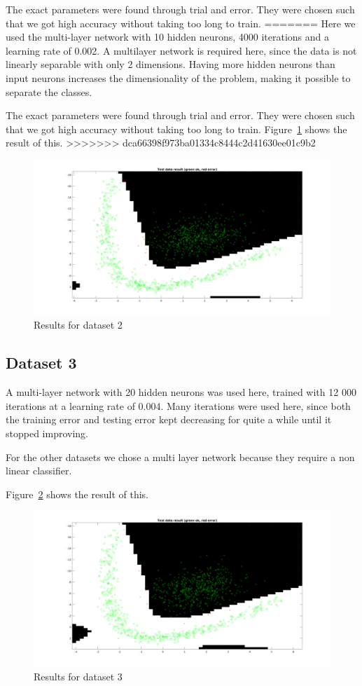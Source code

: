 \documentclass{article}
\begin{document}
The exact parameters were found through trial and error. They were
chosen such that we got high accuracy without taking too long to
train.
=======
Here we used the multi-layer network with 10 hidden neurons, 4000 iterations and a
learning rate of 0.002. A multilayer network is required here, since the data
is not linearly separable with only 2 dimensions. Having more hidden neurons
than input neurons increases the dimensionality of the problem, making it
possible to separate the classes.

The exact parameters were found through trial and error. They were chosen such
that we got high accuracy without taking too long to train.
Figure~\ref{fig:res2} shows the result of this.
>>>>>>> dca66398f973ba01334c8444c2d41630ee01c9b2

\begin{figure}
    \includegraphics[width=13cm]{dataset2res.png}
    \caption{Results for dataset 2}
    \label{fig:res2}
\end{figure}

\subsection{Dataset 3}

A multi-layer network with 20 hidden neurons was used here, trained with 12 000
iterations at a learning rate of 0.004. Many iterations were used here, since
both the training error and testing error kept decreasing for quite a while
until it stopped improving.

For the other datasets we chose a multi layer network because they
require a non linear classifier.

Figure~\ref{fig:res3} shows the result of this.

\begin{figure}
    \includegraphics[width=13cm]{dataset3res.png}
    \caption{Results for dataset 3}
    \label{fig:res3}
\end{figure}
\end{document}
